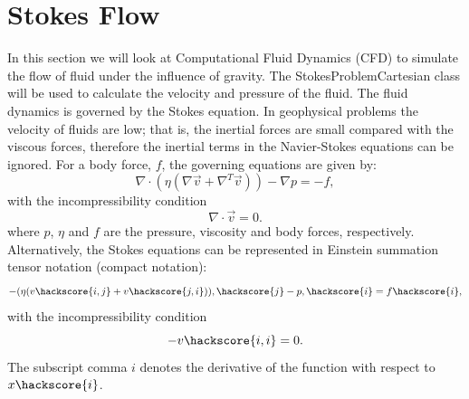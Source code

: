 
\section{Stokes Flow}
\label{STOKES FLOW CHAP}

In this section we will look at Computational Fluid Dynamics (CFD) to simulate the flow of fluid under the influence of gravity. The StokesProblemCartesian class will be used to calculate the velocity and pressure of the fluid.
The fluid dynamics is governed by the Stokes equation. In geophysical problems the velocity of fluids are low; that is, the inertial forces are small compared with the viscous forces, therefore the inertial terms in the Navier-Stokes equations can be ignored. For a body force, $f$, the governing equations are given by:
%
\begin{equation}
\nabla \cdot (\eta(\nabla \vec{v} + \nabla^{T} \vec{v})) - \nabla p = -f,
\label{GENERAL NAVIER STOKES}
\end{equation}
%
with the incompressibility condition
%
\begin{equation}
\nabla \cdot \vec{v} = 0.
\label{INCOMPRESSIBILITY}
\end{equation}
%
where $p$, $\eta$ and $f$ are the pressure, viscosity and body forces, respectively. 
Alternatively, the Stokes equations can be represented in Einstein summation tensor notation (compact notation):
%
\begin{equation}
-(\eta(v\hackscore{i,j} + v\hackscore{j,i})),\hackscore{j} - p,\hackscore{i} = f\hackscore{i},
\label{GENERAL NAVIER STOKES COM}
\end{equation}
%
with the incompressibility condition
%
\begin{equation}
-v\hackscore{i,i} = 0.
\label{INCOMPRESSIBILITY COM}
\end{equation}
%
The subscript comma $i$ denotes the derivative of the function with respect to $x\hackscore{i}$.
%
%
%
